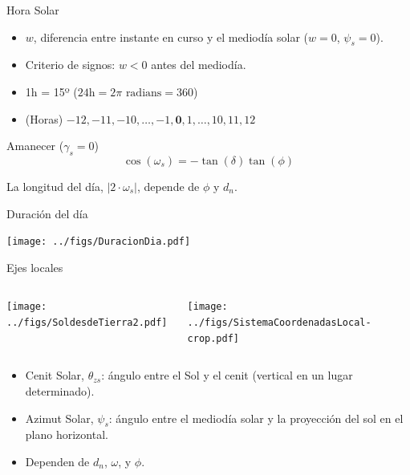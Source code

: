 \documentclass[xcolor={usenames,svgnames,dvipsnames}]{beamer}
\begin{document}
\begin{frame}[label={sec:org20a34ad}]{Hora Solar}
\begin{itemize}
\item \(w\), diferencia entre instante en curso y el mediodía solar (\(w = 0\), \(\psi_s = 0\)).
\item Criterio de signos: \(w < 0\) antes del mediodía.
\item 1h = 15º (\(24\text{h} = 2\pi \text{ radians} = 360\))
\item (Horas) \(-12, -11, -10, \dots, -1, \textbf{0}, 1, \dots, 10, 11, 12\)
\end{itemize}

\begin{block}{Amanecer (\(\gamma_{s}=0\))}
\[
\cos(\omega_{s}) = -\tan(\delta)\tan(\phi)
\]

La longitud del día, \(|2 \cdot \omega_s|\), depende de \(\phi\) y \(d_n\).
\end{block}
\end{frame}

\begin{frame}[label={sec:org42faa65}]{Duración del día}
\begin{center}
\texttt{[image: ../figs/DuracionDia.pdf]}
\end{center}
\end{frame}

\begin{frame}[label={sec:orgd836e0d},plain]{Ejes locales}
\begin{columns}
\begin{column}{0.5\columnwidth}
\begin{center}
\texttt{[image: ../figs/SoldesdeTierra2.pdf]}
\end{center}
\end{column}

\begin{column}{0.5\columnwidth}
\begin{center}
\texttt{[image: ../figs/SistemaCoordenadasLocal-crop.pdf]}
\end{center}
\end{column}
\end{columns}

\begin{itemize}
\item \alert{Cenit Solar}, \(\theta_{zs}\): ángulo entre el Sol y el cenit (vertical en un lugar determinado).
\item \alert{Azimut Solar}, \(\psi_s\): ángulo entre el mediodía solar y la proyección del sol en el plano horizontal.
\item Dependen de \(d_n\), \(\omega\), y \(\phi\).
\end{itemize}
\end{frame}
\end{document}
